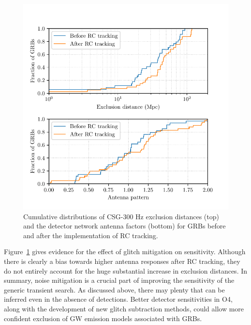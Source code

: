\begin{figure}[h]
  \centering
  \includegraphics{figures/grb/compare-rc.pdf}
  \caption
	{Cumulative distributions of CSG-300 Hz exclusion distances (top) and the detector network antenna factors (bottom) for GRBs before and after the implementation of RC tracking.}
  \label{fig:grb-o3b-compare-rc}
\end{figure}

Figure~\ref{fig:grb-o3b-compare-rc} gives evidence for the effect of glitch mitigation on \xpip sensitivity.
Although there is clearly a bias towards higher antenna responses after RC tracking, they do not entirely account for the huge substantial increase in exclusion distances.
In summary, noise mitigation is a crucial part of improving the sensitivity of the generic transient search.
As discussed above, there may plenty that can be inferred even in the absence of detections.
Better detector sensitivities in \ac{O4}, along with the development of new glitch subtraction methods, could allow more confident exclusion of GW emission models associated with GRBs.
